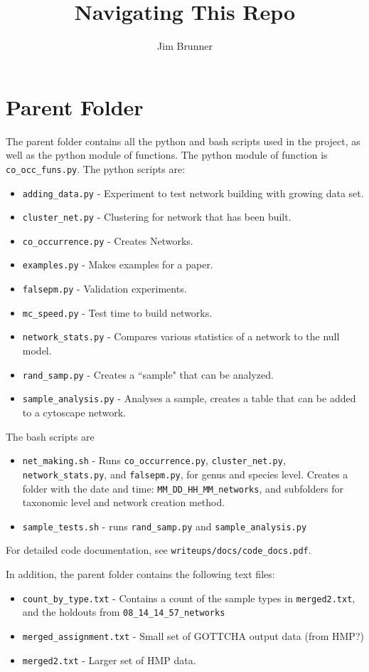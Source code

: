 \documentclass[10pt]{article}
\author{Jim Brunner}
\title{Navigating This Repo}
\theoremstyle{definition}
\numberwithin{theorem}{section}
\numberwithin{definition}{section}
\numberwithin{lemma}{section}
\numberwithin{corollary}{section}
\numberwithin{clm}{section}
\numberwithin{rmk}{section}
\begin{document}
\maketitle

\section{Parent Folder}
The parent folder contains all the python and bash scripts used in the project, as well as the python module of functions. The python module of function is \verb|co_occ_funs.py|. The python scripts are:
\begin{itemize}
	\item \verb|adding_data.py| - Experiment to test network building with growing data set.
	\item \verb|cluster_net.py| - Clustering for network that has been built.
	\item \verb|co_occurrence.py| - Creates Networks.
	\item \verb|examples.py| - Makes examples for a paper.
	\item \verb|falsepm.py| - Validation experiments.
	\item \verb|mc_speed.py| - Test time to build networks.
	\item \verb|network_stats.py| - Compares various statistics of a network to the null model.
	\item \verb|rand_samp.py| - Creates a ``sample" that can be analyzed.
	\item \verb|sample_analysis.py| - Analyses a sample, creates a table that can be added to a cytoscape network.
\end{itemize}

The bash scripts are
\begin{itemize}
	\item \verb|net_making.sh| - Runs \verb|co_occurrence.py|, \verb|cluster_net.py|, \verb|network_stats.py|, and \verb|falsepm.py|, for genus and species level. Creates a folder with the date and time: \verb|MM_DD_HH_MM_networks|, and subfolders for taxonomic level and network creation method. 
	\item \verb|sample_tests.sh| - runs \verb|rand_samp.py| and \verb|sample_analysis.py|
\end{itemize}

For detailed code documentation, see \verb|writeups/docs/code_docs.pdf|.

In addition, the parent folder contains the following text files:
\begin{itemize}
	\item \verb|count_by_type.txt| - Contains a count of the sample types in \verb|merged2.txt|, and the holdouts from \verb|08_14_14_57_networks|
	\item \verb|merged_assignment.txt| - Small set of GOTTCHA output data (from HMP?)
	\item \verb|merged2.txt| - Larger set of HMP data.
\end{itemize}
\end{document}
